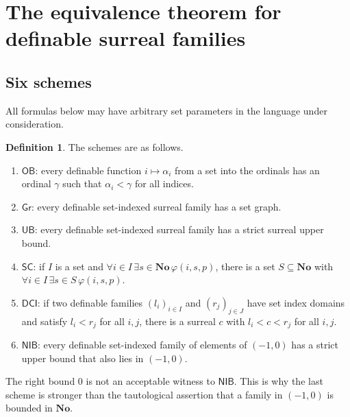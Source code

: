 \documentclass[11pt,letterpaper]{article}
\theoremstyle{definition}
\newtheorem{definition}[definition]{Definition}\aliascntresetthe{definition}
\theoremstyle{remark}
\newcommand{\No}{\mathbf{No}}
\newcommand{\OB}{\mathsf{OB}}
\newcommand{\Gr}{\mathsf{Gr}}
\newcommand{\UB}{\mathsf{UB}}
\newcommand{\SC}{\mathsf{SC}}
\newcommand{\DCI}{\mathsf{DCI}}
\newcommand{\NIB}{\mathsf{NIB}}
\begin{document}
\section{The equivalence theorem for definable surreal families}
\label{hset:zr:sec:equivalence}

\subsection{Six schemes}
All formulas below may have arbitrary set parameters in the language under consideration.

\begin{definition}
The schemes are as follows.
\begin{enumerate}[label=(\arabic*)]
\item $\OB$: every definable function $i\mapsto\alpha_i$ from a set into the ordinals has an ordinal $\gamma$ such that $\alpha_i<\gamma$ for all indices.
\item $\Gr$: every definable set-indexed surreal family has a set graph.
\item $\UB$: every definable set-indexed surreal family has a strict surreal upper bound.
\item $\SC$: if $I$ is a set and $\forall i\in I\,\exists s\in\No\,\varphi(i,s,p)$, there is a set $S\subseteq\No$ with $\forall i\in I\,\exists s\in S\,\varphi(i,s,p)$.
\item $\DCI$: if two definable families $(l_i)_{i\in I}$ and $(r_j)_{j\in J}$ have set index domains and satisfy $l_i<r_j$ for all $i,j$, there is a surreal $c$ with $l_i<c<r_j$ for all $i,j$.
\item $\NIB$: every definable set-indexed family of elements of $(-1,0)$ has a strict upper bound that also lies in $(-1,0)$.
\end{enumerate}
\end{definition}
The right bound $0$ is not an acceptable witness to $\NIB$. This is why the last scheme is stronger than the tautological assertion that a family in $(-1,0)$ is bounded in $\No$.
\end{document}
